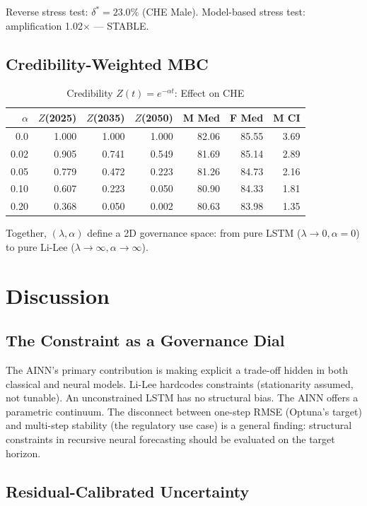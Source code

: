 \documentclass[11pt,a4paper]{article}
\begin{document}
Reverse stress test: $\delta^* = 23.0\%$ (CHE Male). Model-based stress test: amplification 1.02$\times$ --- STABLE.

\subsection{Credibility-Weighted MBC}

\begin{table}[H]
\centering
\caption{Credibility $Z(t) = e^{-\alpha t}$: Effect on CHE}
\label{tab:credibility}
\begin{tabular}{@{}rrrrrrr@{}}
\toprule
$\alpha$ & $Z$(2025) & $Z$(2035) & $Z$(2050) & M Med & F Med & M CI \\ \midrule
0.0  & 1.000 & 1.000 & 1.000 & 82.06 & 85.55 & 3.69 \\
0.02 & 0.905 & 0.741 & 0.549 & 81.69 & 85.14 & 2.89 \\
0.05 & 0.779 & 0.472 & 0.223 & 81.26 & 84.73 & 2.16 \\
0.10 & 0.607 & 0.223 & 0.050 & 80.90 & 84.33 & 1.81 \\
0.20 & 0.368 & 0.050 & 0.002 & 80.63 & 83.98 & 1.35 \\ \bottomrule
\end{tabular}
\end{table}

Together, $(\lambda, \alpha)$ define a 2D governance space: from pure LSTM ($\lambda \to 0, \alpha = 0$) to pure Li-Lee ($\lambda \to \infty, \alpha \to \infty$).

\section{Discussion}

\subsection{The Constraint as a Governance Dial}

The AINN's primary contribution is making explicit a trade-off hidden in both classical and neural models. Li-Lee hardcodes constraints (stationarity assumed, not tunable). An unconstrained LSTM has no structural bias. The AINN offers a parametric continuum. The disconnect between one-step RMSE (Optuna's target) and multi-step stability (the regulatory use case) is a general finding: structural constraints in recursive neural forecasting should be evaluated on the target horizon.

\subsection{Residual-Calibrated Uncertainty}
\end{document}
